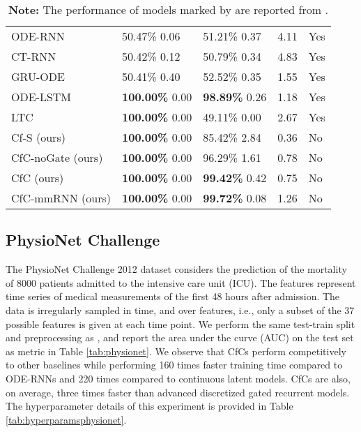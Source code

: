 \documentclass[12pt]{article}
\begin{document}
\begin{table}[t]
\begin{tabular}{lllll}
        ODE-RNN \cite{rubanova2019latent}  & 50.47\%  0.06 & 51.21\%  0.37 & 4.11 & Yes\\
        CT-RNN \cite{funahashi1993approximation} & 50.42\%  0.12 & 50.79\%  0.34 & 4.83 & Yes\\
        GRU-ODE \cite{rubanova2019latent} & 50.41\%  0.40 & 52.52\%  0.35 & 1.55 & Yes \\
        ODE-LSTM \cite{lechner2020learning} & \textbf{100.00\%}  0.00 &
        \textbf{98.89\%}  0.26 & 1.18 & Yes \\
        LTC \cite{hasani2021liquid} & \textbf{100.00\%}  0.00 &  49.11\%  0.00 & 2.67 & Yes \\
        \cmidrule{1-5}
        Cf-S (ours) & \textbf{100.00\%}  0.00 &  85.42\%  2.84 & 0.36 & No \\
        CfC-noGate (ours) & \textbf{100.00\%}  0.00 & 96.29\%  1.61 & 0.78 & No \\
        CfC (ours) & \textbf{100.00\%}  0.00 & \textbf{99.42\%}  0.42 & 0.75 & No \\
        CfC-mmRNN (ours)  & \textbf{100.00\%}  0.00 & \textbf{99.72\%}  0.08 & 1.26 & No \\
        \bottomrule
    \end{tabular}
    \caption*{\footnotesize \textbf{Note:} The performance of models marked by  are reported from \cite{lechner2020learning}.}
    \label{tab:synthetic}
\end{table}



\subsection*{PhysioNet Challenge}
The PhysioNet Challenge 2012 dataset considers the prediction of the mortality of 8000 patients admitted to the intensive care unit (ICU). The features represent time series of medical measurements of the first 48 hours after admission. The data is irregularly sampled in time, and over features, i.e., only a subset of the 37 possible features is given at each time point.
We perform the same test-train split and preprocessing as \cite{rubanova2019latent}, and report the area under the curve (AUC) on the test set as metric in Table \ref{tab:physionet}. We observe that CfCs perform competitively to other baselines while performing 160 times faster training time compared to ODE-RNNs and 220 times compared to continuous latent models. CfCs are also, on average, three times faster than advanced discretized gated recurrent models. The hyperparameter details of this experiment is provided in Table \ref{tab:hyperparamsphysionet}. 
\end{document}
